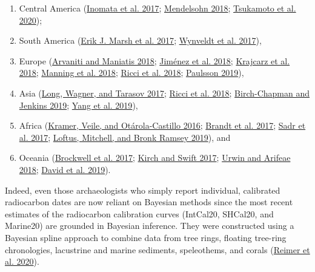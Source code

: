 \documentclass[
]{article}
\providecommand{\tightlist}{%
  \setlength{\itemsep}{0pt}\setlength{\parskip}{0pt}}
\begin{document}
\begin{enumerate}
\def\labelenumi{\roman{enumi}.}
\tightlist
\item
  Central America
  (\protect\hyperlink{ref-inomata_high-precision_2017}{Inomata et al.
  2017}; \protect\hyperlink{ref-mendelsohn_chronology_2018}{Mendelsohn
  2018}; \protect\hyperlink{ref-tsukamoto_building_2020}{Tsukamoto et
  al. 2020});
\item
  South America (\protect\hyperlink{ref-marsh_dating_2017}{Erik J. Marsh
  et al. 2017}; \protect\hyperlink{ref-wynveldt_late_2017}{Wynveldt et
  al. 2017}),
\item
  Europe (\protect\hyperlink{ref-arvaniti_tracing_2018}{Arvaniti and
  Maniatis 2018}; \protect\hyperlink{ref-jimenez_cultural_2018}{Jiménez
  et al. 2018}; \protect\hyperlink{ref-krajcarz_towards_2018}{Krajcarz
  et al. 2018}; \protect\hyperlink{ref-manning_new_2018}{Manning et al.
  2018}; \protect\hyperlink{ref-ricci_chronological_2018}{Ricci et al.
  2018}; \protect\hyperlink{ref-paulsson_radiocarbon_2019}{Paulsson
  2019}),
\item
  Asia (\protect\hyperlink{ref-long_bayesian_2017}{Long, Wagner, and
  Tarasov 2017}; \protect\hyperlink{ref-ricci_chronological_2018}{Ricci
  et al. 2018};
  \protect\hyperlink{ref-birch-chapman_bayesian_2019}{Birch-Chapman and
  Jenkins 2019}; \protect\hyperlink{ref-yang_refined_2019}{Yang et al.
  2019}),
\item
  Africa (\protect\hyperlink{ref-kramer_sibling_2016}{Kramer, Veile, and
  Otárola-Castillo 2016}; \protect\hyperlink{ref-brandt_new_2017}{Brandt
  et al. 2017}; \protect\hyperlink{ref-sadr_new_2017}{Sadr et al. 2017};
  \protect\hyperlink{ref-loftus_archaeological_2019}{Loftus, Mitchell,
  and Bronk Ramsey 2019}), and
\item
  Oceania (\protect\hyperlink{ref-brockwell_new_2017}{Brockwell et al.
  2017}; \protect\hyperlink{ref-kirch_new_2017}{Kirch and Swift 2017};
  \protect\hyperlink{ref-urwin_chronology_2018}{Urwin and Arifeae 2018};
  \protect\hyperlink{ref-david_dating_2019}{David et al. 2019}).
\end{enumerate}

Indeed, even those archaeologists who simply report individual,
calibrated radiocarbon dates are now reliant on Bayesian methods since
the most recent estimates of the radiocarbon calibration curves
(IntCal20, SHCal20, and Marine20) are grounded in Bayesian inference.
They were constructed using a Bayesian spline approach to combine data
from tree rings, floating tree-ring chronologies, lacustrine and marine
sediments, speleothems, and corals
(\protect\hyperlink{ref-reimer_intcal20_2020}{Reimer et al. 2020}).
\end{document}
